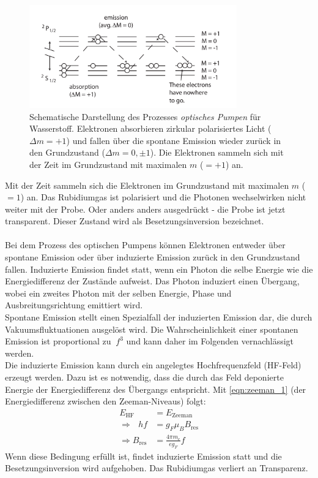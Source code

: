\begin{figure}
    \centering
    \includegraphics[width=0.8\textwidth]{content/img/optisches_pumpen.png}
    \caption{Schematische Darstellung des Prozesses \textit{optisches Pumpen} für Wasserstoff.
    Elektronen absorbieren zirkular polarisiertes Licht ($\Delta m = +1$) und 
    fallen über die spontane Emission wieder zurück in den Grundzustand ($\Delta m = 0, \pm 1$).
    Die Elektronen sammeln sich mit der Zeit im Grundzustand mit maximalen $m$ ($=+1$) an.
    }
    \label{fig:optisches_pumpen}
\end{figure}
Mit der Zeit sammeln sich die Elektronen im Grundzustand mit maximalen $m$ ($=1$) an.
Das Rubidiumgas ist polarisiert und die Photonen wechselwirken nicht weiter mit der Probe.
Oder anders anders ausgedrückt - die Probe ist jetzt transparent.
Dieser Zustand wird als Besetzungsinversion bezeichnet.
\\
\\
Bei dem Prozess des optischen Pumpens können Elektronen entweder über spontane Emission oder über induzierte Emission zurück in den Grundzustand fallen.
Induzierte Emission findet statt, wenn ein Photon die selbe Energie wie die Energiedifferenz der Zustände aufweist.
Das Photon induziert einen Übergang, wobei ein zweites Photon mit der selben Energie, Phase und Ausbreitungsrichtung emittiert wird.
\\
Spontane Emission stellt einen Spezialfall der induzierten Emission dar, die durch Vakuumsfluktuationen ausgelöst wird.
Die Wahrscheinlichkeit einer spontanen Emission ist proportional zu $~f^3$ und kann daher im Folgenden vernachlässigt werden.
\\
Die induzierte Emission kann durch ein angelegtes Hochfrequenzfeld (HF-Feld) erzeugt werden.
Dazu ist es notwendig, dass die durch das Feld deponierte Energie der Energiedifferenz des Übergangs entspricht.
Mit \autoref{eqn:zeeman_1} (der Energiedifferenz zwischen den Zeeman-Niveaus) folgt:
\begin{align}
    E_\text{HF} &= E_\text{Zeeman} \\
    \Rightarrow \:\:\: h f &= g_F \mu_B B_\text{res} \\
    \Rightarrow B_\text{res} &= \frac{4\pi m_e}{e g_F} f \label{eqn:resonanzfrequenz}
\end{align}
Wenn diese Bedingung erfüllt ist, findet induzierte Emission statt und die Besetzungsinversion wird aufgehoben.
Das Rubidiumgas verliert an Transparenz.

